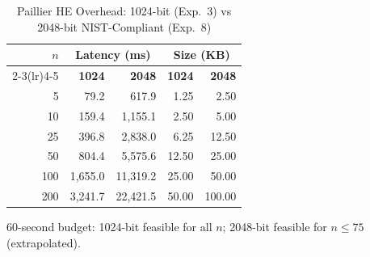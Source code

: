 \documentclass[journal,twoside,10pt]{IEEEtran}
\begin{document}
\begin{table}[t]
\centering
\caption{Paillier HE Overhead: 1024-bit (Exp.~3) vs 2048-bit
         NIST-Compliant (Exp.~8)}
\label{tab:crypto}
\renewcommand{\arraystretch}{1.1}
\small
\begin{tabular}{rrrrr}
\toprule
$n$ & \multicolumn{2}{c}{\textbf{Latency (ms)}} &
\multicolumn{2}{c}{\textbf{Size (KB)}} \\
\cmidrule(lr){2-3}\cmidrule(lr){4-5}
 & \textbf{1024} & \textbf{2048} & \textbf{1024} & \textbf{2048}\\
\midrule
   5 &    79.2 &    617.9 &  1.25 &  2.50 \\
  10 &   159.4 &  1{,}155.1 &  2.50 &  5.00 \\
  25 &   396.8 &  2{,}838.0 &  6.25 & 12.50 \\
  50 &   804.4 &  5{,}575.6 & 12.50 & 25.00 \\
 100 & 1{,}655.0 & 11{,}319.2 & 25.00 & 50.00 \\
 200 & 3{,}241.7 & 22{,}421.5 & 50.00 & 100.00 \\
\bottomrule
\end{tabular}
{\footnotesize 60-second budget: 1024-bit feasible for all $n$;
 2048-bit feasible for $n\!\leq\!75$ (extrapolated).}
\end{table}
\end{document}
